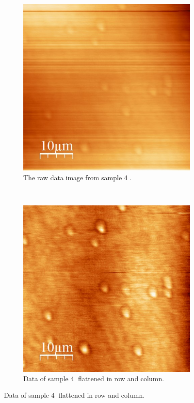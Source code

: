 \documentclass[paper=a4,fontsize=10pt,DIV=18,twocolumn,parskip=half]{scrartcl}
\numberwithin{equation}{section}    %
\begin{document}
\begin{figure}
    \centering
    \begin{subfigure}{0.45\columnwidth}
		\includegraphics[width=\columnwidth]{Bilder/7}
        \caption{The raw data image from sample \textcircled{4}. }
        \label{7}
    \end{subfigure}
    ~
    \begin{subfigure}{0.45\columnwidth}
        \includegraphics[width=\columnwidth]{Bilder/7f}
        \caption{Data of sample \textcircled{4} flattened in row and column. }
        \label{7f}
        \label{vielI}
    \end{subfigure}


\end{figure}
\end{document}
